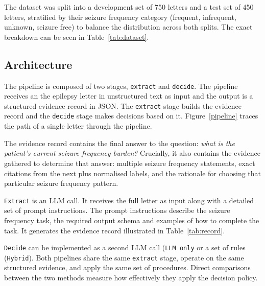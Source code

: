 \documentclass[conference]{IEEEtran}
\begin{document}
The dataset was split into a development set of 750
letters and a test set of 450 letters, stratified by their 
seizure frequency category (frequent, infrequent, 
unknown, seizure free) to balance the distribution 
across both splits. The exact breakdown can be 
seen in Table~\ref{tab:dataset}.

\subsection{Architecture}
\label{sec:architecture}

The pipeline is composed of two stages, \texttt{extract} and 
\texttt{decide}. The pipeline receives an the epilepsy letter 
in unstructured text as input and the output is a structured evidence
record in JSON. The \texttt{extract} stage builds the evidence record
and the \texttt{decide} stage makes decisions based on it. 
Figure~\ref{pipeline} traces the path of a single letter through 
the pipeline. 

The evidence record contains the final 
answer to the question: \emph{what is the patient's current
seizure frequency burden?} Crucially, it also contains the evidence 
gathered to determine that answer: multiple seizure 
frequency statements, exact citations from the next plus
normalised labels, and the rationale for choosing that 
particular seizure frequency pattern. 

\texttt{Extract} is an LLM call. It receives the full letter
as input along with a detailed set of prompt instructions. 
The prompt instructions describe the seizure frequency task, 
the required output schema and examples of how to 
complete the task. It generates the evidence record 
illustrated in Table~\ref{tab:record}.

\texttt{Decide} can be implemented as a second 
LLM call (\texttt{LLM only} or a set of rules (\texttt{Hybrid}). 
Both pipelines share the same \texttt{extract} stage, operate 
on the same structured evidence, 
and apply the same set of procedures. Direct comparisons 
between the two methods measure how effectively they 
apply the decision policy. 
\end{document}
